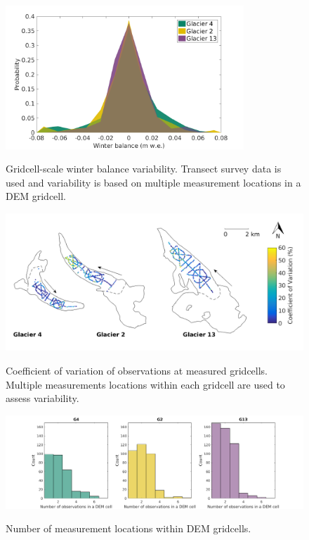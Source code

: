 \documentclass{sfuthesis}
\begin{document}
\begin{figure}[H]
	\centering
	\includegraphics[width =0.8\textwidth]{SWEvarMeasureLocHIST.png}\\
	\caption{Gridcell-scale winter balance variability. Transect survey data is used and variability is based on multiple measurement locations in a DEM gridcell.}
	\label{fig:SWEvar_MultLoc_hist}
\end{figure}

\begin{figure}[H]
	\centering
	\includegraphics[width =\textwidth]{Map_cellstd_measureLoc.png}\\
	\caption{Coefficient of variation of observations at measured gridcells. Multiple measurements locations within each gridcell are used to assess variability.}
	\label{fig:SWEvar_MultLoc_map}
\end{figure}

\begin{figure}[H]
	\centering
	\includegraphics[width =\textwidth]{NumObsPerCell.png}\\
	\caption{Number of measurement locations within DEM gridcells.}
	\label{fig:NumObsPerCell}
\end{figure}
\end{document}

